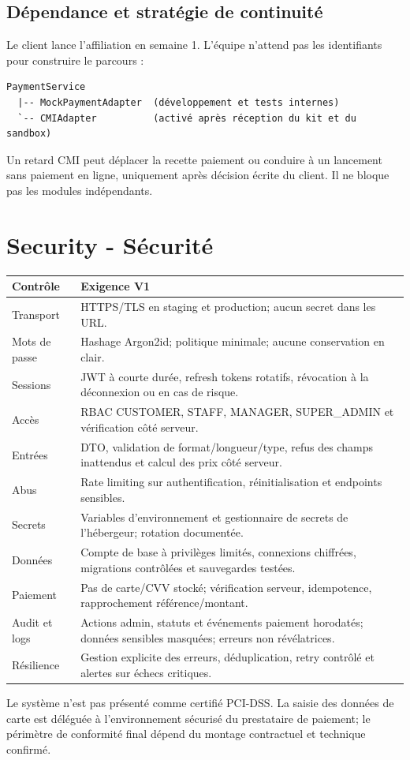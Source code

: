 \documentclass[10pt,a4paper]{article}
\begin{document}
\subsection{Dépendance et stratégie de continuité}
Le client lance l'affiliation en semaine 1. L'équipe n'attend pas les identifiants pour construire le parcours :
\begin{verbatim}
PaymentService
  |-- MockPaymentAdapter  (développement et tests internes)
  `-- CMIAdapter          (activé après réception du kit et du sandbox)
\end{verbatim}
Un retard CMI peut déplacer la recette paiement ou conduire à un lancement sans paiement en ligne, uniquement après décision écrite du client. Il ne bloque pas les modules indépendants.

\section{Security - Sécurité}
\begin{longtable}{@{}L{4cm}L{11.5cm}@{}}
\toprule
\textbf{Contrôle} & \textbf{Exigence V1} \\
\midrule
Transport & HTTPS/TLS en staging et production; aucun secret dans les URL. \\
Mots de passe & Hashage Argon2id; politique minimale; aucune conservation en clair. \\
Sessions & JWT à courte durée, refresh tokens rotatifs, révocation à la déconnexion ou en cas de risque. \\
Accès & RBAC CUSTOMER, STAFF, MANAGER, SUPER\_ADMIN et vérification côté serveur. \\
Entrées & DTO, validation de format/longueur/type, refus des champs inattendus et calcul des prix côté serveur. \\
Abus & Rate limiting sur authentification, réinitialisation et endpoints sensibles. \\
Secrets & Variables d'environnement et gestionnaire de secrets de l'hébergeur; rotation documentée. \\
Données & Compte de base à privilèges limités, connexions chiffrées, migrations contrôlées et sauvegardes testées. \\
Paiement & Pas de carte/CVV stocké; vérification serveur, idempotence, rapprochement référence/montant. \\
Audit et logs & Actions admin, statuts et événements paiement horodatés; données sensibles masquées; erreurs non révélatrices. \\
Résilience & Gestion explicite des erreurs, déduplication, retry contrôlé et alertes sur échecs critiques. \\
\bottomrule
\end{longtable}
Le système n'est pas présenté comme certifié PCI-DSS. La saisie des données de carte est déléguée à l'environnement sécurisé du prestataire de paiement; le périmètre de conformité final dépend du montage contractuel et technique confirmé.
\end{document}
